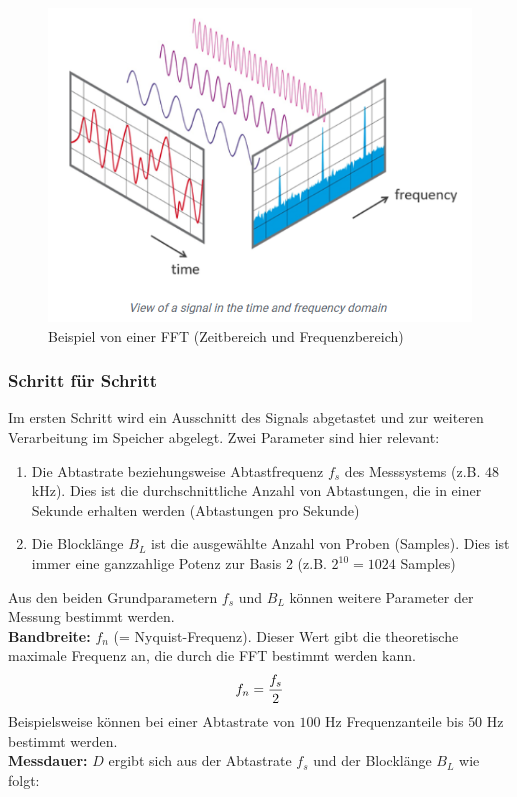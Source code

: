 \begin{figure}[H]
	\centering
	\includegraphics[width=0.5\linewidth]{Bilder/FFTBeispiel.png}
	\caption{Beispiel von einer FFT (Zeitbereich und Frequenzbereich)\citep{NTIAudioFFT}}
	\label{fig:FFTBeispiel}
\end{figure}

\subsubsection{Schritt für Schritt}
Im ersten Schritt wird ein Ausschnitt des Signals abgetastet und zur weiteren Verarbeitung im Speicher abgelegt. Zwei Parameter sind hier relevant:
\begin{enumerate}
	\item Die Abtastrate beziehungsweise Abtastfrequenz $f_s$ des Messsystems (z.B. $48$ kHz). Dies ist die durchschnittliche Anzahl von Abtastungen, die in einer Sekunde erhalten werden (Abtastungen pro Sekunde)
	\item Die Blocklänge $B_L$ ist die ausgewählte Anzahl von Proben (Samples). Dies ist immer eine ganzzahlige Potenz zur Basis 2 (z.B. $2^{10}=1024$ Samples)
\end{enumerate}
Aus den beiden Grundparametern $f_s$ und $B_L$ können weitere Parameter der Messung bestimmt werden. \\
\textbf{Bandbreite:}  $f_n$ (= Nyquist-Frequenz). Dieser Wert gibt die theoretische maximale Frequenz an, die durch die FFT bestimmt werden kann.
\begin{align}
	\centering
	f_n = \frac{f_s}{2}
	\label{gl:Nyquist-Frequenz}
\end{align}
Beispielsweise können bei einer Abtastrate von $100$ Hz Frequenzanteile bis $50$ Hz bestimmt werden.\\
\textbf{Messdauer:} $D$ ergibt sich aus der Abtastrate $f_s$ und der Blocklänge $B_L$ wie folgt:

